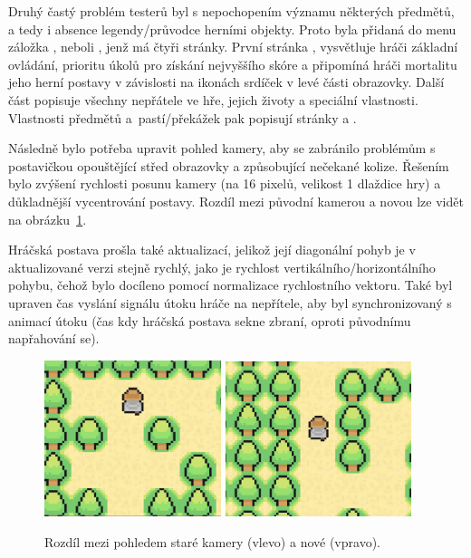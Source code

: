 Druhý častý problém testerů byl s nepochopením významu některých předmětů, a tedy i absence legendy/průvodce herními objekty. Proto byla přidaná do menu záložka , neboli , jenž má čtyři stránky. První stránka , vysvětluje hráči základní ovládání, prioritu úkolů pro získání nejvyššího skóre a připomíná hráči mortalitu jeho herní postavy v závislosti na ikonách srdíček v levé části obrazovky. Další část  popisuje všechny nepřátele ve hře, jejich životy a speciální vlastnosti. Vlastnosti předmětů a~pastí/překážek pak popisují stránky  a .

Následně bylo potřeba upravit pohled kamery, aby se zabránilo problémům s postavičkou opouštějící střed obrazovky a způsobující nečekané kolize. Řešením bylo zvýšení rychlosti posunu kamery (na 16 pixelů, velikost 1 dlaždice hry) a důkladnější vycentrování postavy. Rozdíl mezi původní kamerou a novou lze vidět na obrázku~\ref{fig:rozdil_kamer}.

Hráčská postava prošla také aktualizací, jelikož její diagonální pohyb je v aktualizované verzi stejně rychlý, jako je rychlost vertikálního/horizontálního pohybu, čehož bylo docíleno pomocí normalizace rychlostního vektoru. Také byl upraven čas vyslání signálu útoku hráče na nepřítele, aby byl synchronizovaný s animací útoku (čas kdy hráčská postava sekne zbraní, oproti původnímu napřahování se).

\vspace{0.5cm}
\begin{figure}[hb]
    \centering
    \includegraphics[width=0.46\textwidth]{obrazky-figures/ch5/old_camera.png}\hspace{0.5cm}
    \includegraphics[width=0.484\textwidth]{obrazky-figures/ch5/new_camera.png}
    \caption{Rozdíl mezi pohledem staré kamery (vlevo) a nové (vpravo).}
    \label{fig:rozdil_kamer}
\end{figure}

